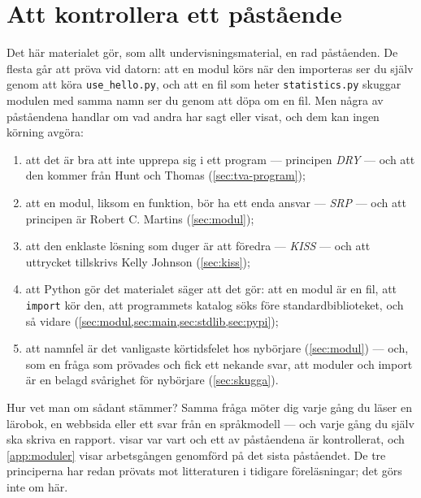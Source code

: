 \chapter{Att kontrollera ett påstående}
\label{app:verifiera-moduler}

Det här materialet gör, som allt undervisningsmaterial, en rad
påståenden.  De flesta går att pröva vid datorn: att en modul körs när
den importeras ser du själv genom att köra \texttt{use\_hello.py}, och
att en fil som heter \texttt{statistics.py} skuggar modulen med samma
namn ser du genom att döpa om en fil.  Men några av påståendena handlar
om vad andra har sagt eller visat, och dem kan ingen körning avgöra:
\begin{enumerate}
  \item att det är bra att inte upprepa sig i ett program --- principen
    \emph{DRY} --- och att den kommer från Hunt och Thomas
    (\cref{sec:tva-program});
  \item att en modul, liksom en funktion, bör ha ett enda ansvar ---
    \emph{SRP} --- och att principen är Robert C. Martins
    (\cref{sec:modul});
  \item att den enklaste lösning som duger är att föredra ---
    \emph{KISS} --- och att uttrycket tillskrivs Kelly Johnson
    (\cref{sec:kiss});
  \item att Python gör det materialet säger att det gör: att en modul
    är en fil, att \texttt{import} kör den, att programmets
    katalog söks före standardbiblioteket, och så vidare
    (\cref{sec:modul,sec:main,sec:stdlib,sec:pypi});
  \item att namnfel är det vanligaste körtidsfelet hos nybörjare
    (\cref{sec:modul}) --- och, som en fråga som prövades och fick ett
    nekande svar, att moduler och import är en belagd svårighet för
    nybörjare (\cref{sec:skugga}).
\end{enumerate}
Hur vet man om sådant stämmer?  Samma fråga möter dig varje gång du läser
en lärobok, en webbsida eller ett svar från en språkmodell --- och varje
gång du själv ska skriva en rapport.  
visar var vart och ett av påståendena är kontrollerat, och
\cref{app:moduler} visar arbetsgången genomförd på det sista
påståendet.  De tre principerna har redan prövats mot litteraturen i
tidigare föreläsningar; det görs inte om här.

